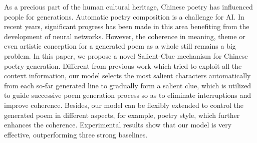 As a precious part of the human cultural heritage, Chinese poetry has influenced people for generations. Automatic poetry composition is a challenge for AI. In recent years, significant progress has been made in this area benefiting from the development of neural networks. However, the coherence in meaning, theme or even artistic conception for a generated poem as a whole still remains a big problem. In this paper, we propose a novel Salient-Clue mechanism for Chinese poetry generation. Different from previous work which tried to exploit all the context information, our model selects the most salient characters automatically from each so-far generated line to gradually form a salient clue, which is utilized to guide successive poem generation process so as to eliminate interruptions and improve coherence. Besides, our model can be flexibly extended to control the generated poem in different aspects, for example, poetry style, which further enhances the coherence. Experimental results show that our model is very effective, outperforming three strong baselines.
